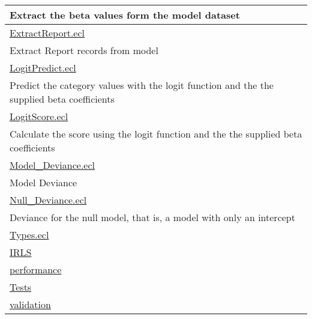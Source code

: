 {\begin{longtable}{|p{\textwidth}|}
Extract the beta values form the model dataset \\
\hline
\hyperlink{ecldoc:toc:LogisticRegression.ExtractReport}{ExtractReport.ecl} \\
Extract Report records from model \\
\hline
\hyperlink{ecldoc:toc:LogisticRegression.LogitPredict}{LogitPredict.ecl} \\
Predict the category values with the logit function and the the supplied beta coefficients \\
\hline
\hyperlink{ecldoc:toc:LogisticRegression.LogitScore}{LogitScore.ecl} \\
Calculate the score using the logit function and the the supplied beta coefficients \\
\hline
\hyperlink{ecldoc:toc:LogisticRegression.Model_Deviance}{Model\_Deviance.ecl} \\
Model Deviance \\
\hline
\hyperlink{ecldoc:toc:LogisticRegression.Null_Deviance}{Null\_Deviance.ecl} \\
Deviance for the null model, that is, a model with only an intercept \\
\hline
\hyperlink{ecldoc:toc:LogisticRegression.Types}{Types.ecl} \\
\hline
\hyperlink{ecldoc:toc:root/LogisticRegression/IRLS}{IRLS} \\
\hline
\hyperlink{ecldoc:toc:root/LogisticRegression/performance}{performance} \\
\hline
\hyperlink{ecldoc:toc:root/LogisticRegression/Tests}{Tests} \\
\hline
\hyperlink{ecldoc:toc:root/LogisticRegression/validation}{validation} \\
\hline
\end{longtable}
}























